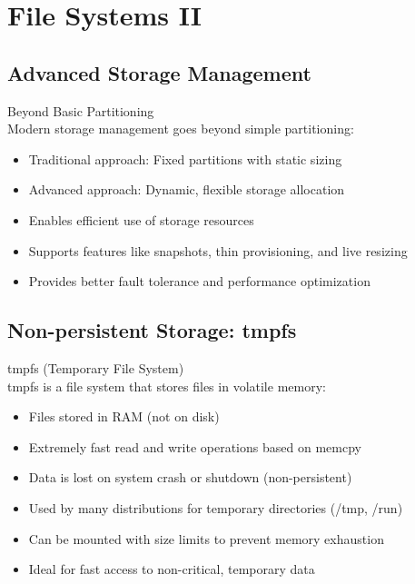 \section{File Systems II}

\subsection{Advanced Storage Management}

\begin{concept}{Beyond Basic Partitioning}\\
    Modern storage management goes beyond simple partitioning:
    \begin{itemize}
        \item Traditional approach: Fixed partitions with static sizing
        \item Advanced approach: Dynamic, flexible storage allocation
        \item Enables efficient use of storage resources
        \item Supports features like snapshots, thin provisioning, and live resizing
        \item Provides better fault tolerance and performance optimization
    \end{itemize}
\end{concept}

\subsection{Non-persistent Storage: tmpfs}

\begin{definition}{tmpfs (Temporary File System)}\\
    tmpfs is a file system that stores files in volatile memory:
    \begin{itemize}
        \item Files stored in RAM (not on disk)
        \item Extremely fast read and write operations based on memcpy
        \item Data is lost on system crash or shutdown (non-persistent)
        \item Used by many distributions for temporary directories (/tmp, /run)
        \item Can be mounted with size limits to prevent memory exhaustion
        \item Ideal for fast access to non-critical, temporary data
    \end{itemize}
\end{definition}

